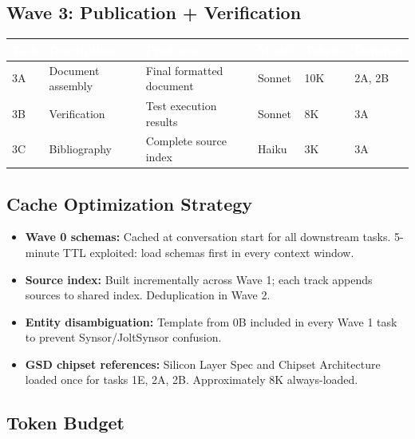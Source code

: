 \documentclass[11pt,letterpaper]{article}
\newcommand{\tableheader}[1]{\textbf{\sffamily\textcolor{white}{#1}}}
\begin{document}
\subsection{Wave 3: Publication + Verification}

\begin{center}
\begin{tabularx}{\textwidth}{C{0.8cm}L{3cm}XC{1.3cm}C{1.3cm}C{2cm}}
\toprule
{}
\tableheader{Task} & \tableheader{Description} & \tableheader{Produces} & \tableheader{Model} & \tableheader{Tokens} & \tableheader{Depends} \\
\midrule
3A & Document assembly & Final formatted document & Sonnet & 10K & 2A, 2B \\
3B & Verification & Test execution results & Sonnet & 8K & 3A \\
3C & Bibliography & Complete source index & Haiku & 3K & 3A \\
\bottomrule
\end{tabularx}
\end{center}

\subsection{Cache Optimization Strategy}

\begin{itemize}[leftmargin=2em]
  \item \textbf{Wave 0 schemas:} Cached at conversation start for all downstream tasks. 5-minute TTL exploited: load schemas first in every context window.
  \item \textbf{Source index:} Built incrementally across Wave 1; each track appends sources to shared index. Deduplication in Wave 2.
  \item \textbf{Entity disambiguation:} Template from 0B included in every Wave 1 task to prevent Synsor/JoltSynsor confusion.
  \item \textbf{GSD chipset references:} Silicon Layer Spec and Chipset Architecture loaded once for tasks 1E, 2A, 2B. Approximately 8K always-loaded.
\end{itemize}

\subsection{Token Budget}
\end{document}

